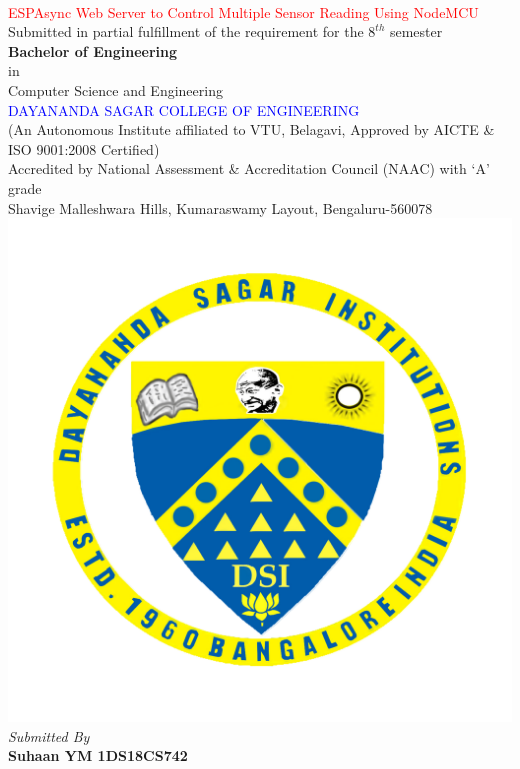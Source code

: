 \documentclass[12pt,a4paper,twocolumn,fleqn]{article}
\begin{document}
\pagestyle{empty}
\onecolumn
\begin{center}
 \\
\textcolor{red}{\LARGE{ESPAsync Web Server to Control Multiple Sensor Reading Using NodeMCU}} \\
\large{Submitted in partial fulfillment of the requirement for the $8^{th}$ semester} \\
\large{\textbf{Bachelor of Engineering}} \\
\large{in} \\
\large{Computer Science and Engineering} \\
\textcolor{blue}{\LARGE{DAYANANDA SAGAR COLLEGE OF ENGINEERING}} \\
\footnotesize{(An Autonomous Institute affiliated to VTU, Belagavi, Approved by AICTE \& ISO 9001:2008 Certified)} \\
\footnotesize{Accredited by National Assessment \& Accreditation Council (NAAC) with ‘A’ grade}  \\
\footnotesize{Shavige Malleshwara Hills, Kumaraswamy Layout, Bengaluru-560078} \\
\includegraphics[scale=0.4]{media/DSCE-min.png} \\
\textit{Submitted By} \\
\textbf{Suhaan YM \space 1DS18CS742} \\

\end{center}
\end{document}

